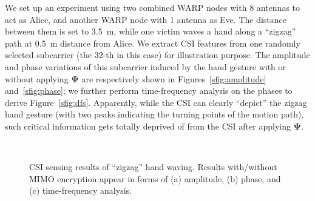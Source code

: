 \documentclass[conference,compsoc]{IEEEtran}
\begin{document}
We set up an experiment using two combined WARP nodes with 8 antennas to act as Alice, and another WARP node with 1 antenna as Eve. The distance between them is set to 3.5~\!m, while one victim waves a hand along a ``zigzag'' path at 0.5~\!m distance from Alice. We extract CSI features from one randomly selected subcarrier (the 32-th in this case) for illustration purpose.
The amplitude and phase variations of this subcarrier induced by the hand gesture with or without applying $\bm{\Psi}$ are respectively shown in Figures~\ref{sfig:amplitude} and~\ref{sfig:phase}; we further perform time-frequency analysis on the phases to derive Figure~\ref{sfig:dfs}. Apparently, while the CSI can clearly ``depict'' the zigzag hand gesture (with two peaks indicating the turning points of the motion path), such critical information gets totally deprived of from the CSI after applying $\bm{\Psi}$.

\begin{figure}[t]
	\setlength\abovecaptionskip{8pt}
        \setlength\belowcaptionskip{-2ex}
	\vspace{-1ex}
	\centering
	\\ \vspace{-1ex}
	\caption{CSI sensing results of ``zigzag'' hand waving. Results with/without MIMO encryption appear in forms of (a) amplitude, (b) phase, and (c) time-frequency analysis.}
	\label{fig:teve}
\end{figure}
\end{document}
